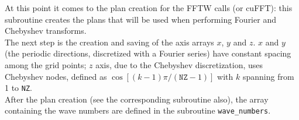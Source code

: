 At this point it comes to the plan creation for the FFTW calls (or cuFFT): this subroutine creates the plans that will be used when performing Fourier and Chebyshev transforms.\\
The next step is the creation and saving of the axis arrays $x$, $y$ and $z$. $x$ and $y$ (the periodic directions, discretized with a Fourier series) have constant spacing among the grid points; $z$ axis, due to the Chebyshev discretization, uses Chebyshev nodes, defined as $\cos{[(k-1)\pi/(\texttt{NZ}-1)]}$ with $k$ spanning from 1 to \texttt{NZ}.\\
After the plan creation (see the corresponding subroutine also), the array containing the wave numbers are defined in the subroutine \texttt{wave\_numbers}.\\
